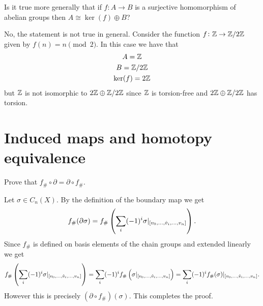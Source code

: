 \documentclass[11pt,a4paper]{article}
\begin{document}
\begin{exercise}
  Is it true more generally that if $f \colon A \to B$
  is a surjective homomorphism of abelian groups then
  $A \cong \ker(f) \oplus B$?
\end{exercise}
\begin{solution}
  No, the statement is not true in general.
  Consider the function $f \colon \mathbb{Z} \to \mathbb{Z}/2\mathbb{Z}$ given by
  $f(n) = n \pmod{2}$.
  In this case we have that
  \begin{gather*}
    A = \mathbb{Z} \\
    B = \mathbb{Z}/2\mathbb{Z} \\
    \ker(f) = 2\mathbb{Z}
  \end{gather*}
  but $\mathbb{Z}$ is not isomorphic to $2\mathbb{Z} \oplus \mathbb{Z}/2\mathbb{Z}$ since
  $\mathbb{Z}$ is torsion-free and $2\mathbb{Z} \oplus \mathbb{Z}/2\mathbb{Z}$ has torsion.
\end{solution}


\section{Induced maps and homotopy equivalence}

\begin{exercise}
  Prove that $f_{\#} \circ \partial = \partial \circ f_{\#}$.
\end{exercise}
\begin{solution}
  Let $\sigma \in C_n(X)$.
  By the definition of the boundary map we get
  \[
    f_{\#}(\partial \sigma) =
    f_{\#}\del{\sum_{i} (-1)^i \sigma\vert_{[v_0,\dots,\hat v_i,\dots,v_n]}}.
  \]
  Since $f_{\#}$ is defined on basis elements of the chain groups
  and extended linearly we get
  \[
    f_{\#}\del{\sum_{i} (-1)^i \sigma\vert_{[v_0,\dots,\hat v_i,\dots,v_n]}} =
    \sum_{i} (-1)^i f_{\#}\del{\sigma\vert_{[v_0,\dots,\hat v_i,\dots,v_n]}} =
    \sum_{i} (-1)^i f_{\#}(\sigma)\vert_{[v_0,\dots,\hat v_i,\dots,v_n]}.
  \]
  However this is precisely $(\partial \circ f_{\#})(\sigma)$.
  This completes the proof.
\end{solution}
\end{document}
